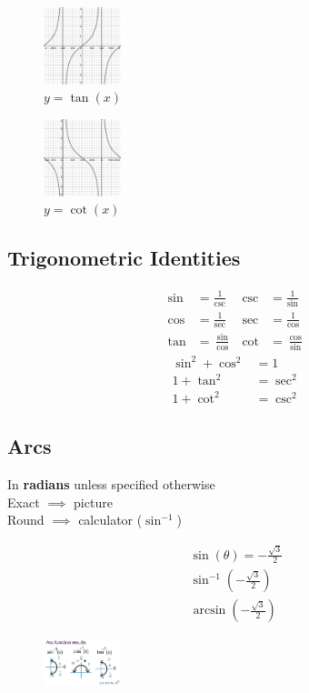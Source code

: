 \documentclass[twocolumn]{article}
\newcommand{\bd}{\textbf}
\begin{document}
\begin{figure}[H]
	\centering
	\includegraphics[width=0.20\textwidth]{tan.png}
	\caption{$ y = \tan(x) $}
\end{figure}

\begin{figure}[H]
	\centering
	\includegraphics[width=0.20\textwidth]{cot.png}
	\caption{$ y = \cot(x) $}
\end{figure}

\subsection*{Trigonometric Identities}

\begin{align*}
	\sin &= \frac{1}{\csc}  & \csc & = \frac{1}{\sin} \\
	\cos &= \frac{1}{\sec} & \sec & = \frac{1}{\cos} \\
	\tan &= \frac{\sin}{\cos}  & \cot & = \frac{\cos}{\sin}
\end{align*}
\vspace{0pt}
\begin{align*}
	\sin^2 + \cos^2 &= 1 \\
	1 + \tan^2 &= \sec^2 \\
	1 + \cot^2 &= \csc^2
\end{align*}
\vspace{-2.2em}
\subsection*{Arcs}
In \bd{radians} unless specified otherwise \\
Exact $\implies$ picture \\
Round $\implies$ calculator ($\sin^{-1}$)

\begin{align*}
	\sin(\theta) = -\frac{\sqrt{3}}{2} \\
	\sin^{-1}(-\frac{\sqrt{3}}{2}) \\
	\arcsin(-\frac{\sqrt{3}}{2})
\end{align*}

\begin{figure}[H]
	\centering
	\includegraphics[width=0.20\textwidth]{ArcTrig.jpg}
\end{figure}
\end{document}
